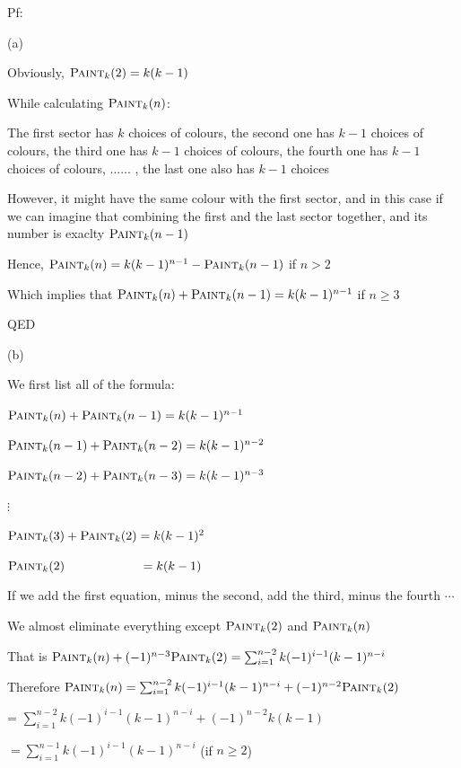 \documentclass[11pt,twoside]{article}
\begin{document}
\hspace*{\fill}

Pf:

(a)

Obviously,
$\textsc{Paint}_k(2) = k(k-1)$

While calculating $\textsc{Paint}_k(n)$:

\qquad The first sector has $k$ choices of colours, the second one has $k-1$ choices of colours, the third one has $k-1$ choices of colours, the fourth one has $k-1$ choices of colours, ...... , the last one also has $k-1$ choices

However, it might have the same colour with the first sector, and in this case if we can imagine that combining the first and the last sector together, and its number is exaclty $\textsc{Paint}_k(n-1)$

Hence, $\textsc{Paint}_k(n) = k(k-1)^{n-1}-\textsc{Paint}_k(n-1)$ if $ n> 2$

Which implies that $\textsc{Paint}_k(n) + \textsc{Paint}_k(n-1) = k(k-1)^{n-1}$ if $ n\geq 3$

QED

\hspace*{\fill}

(b)

We first list all of the formula:

$\textsc{Paint}_k(n) + \textsc{Paint}_k(n-1) = k(k-1)^{n-1}$

$\textsc{Paint}_k(n-1) + \textsc{Paint}_k(n-2) = k(k-1)^{n-2}$

$\textsc{Paint}_k(n-2) + \textsc{Paint}_k(n-3) = k(k-1)^{n-3}$

\qquad  $\vdots$

$\textsc{Paint}_k(3) + \textsc{Paint}_k(2) = k(k-1)^{2}$

$\textsc{Paint}_k(2) \qquad \qquad \qquad  = k(k-1)$

If we add the first equation, minus the second, add the third, minus the fourth $\cdots$

We almost eliminate everything except $\textsc{Paint}_k(2)$ and $\textsc{Paint}_k(n)$

That is $\textsc{Paint}_k(n) + (-1)^{n-3}\textsc{Paint}_k(2)= \sum _{i=1}^{n-2} k(-1)^{i-1}(k-1)^{n-i}$

Therefore $\textsc{Paint}_k(n)= \sum _{i=1}^{n-2} k(-1)^{i-1}(k-1)^{n-i} + (-1)^{n-2}\textsc{Paint}_k(2)$

= $\sum _{i=1}^{n-2} k(-1)^{i-1}(k-1)^{n-i} + (-1)^{n-2}k(k-1)$

$= \sum_{i=1}^{n-1} k(-1)^{i-1} (k-1)^{n-i}$ \qquad(if $n \geq 2$)
\end{document}
